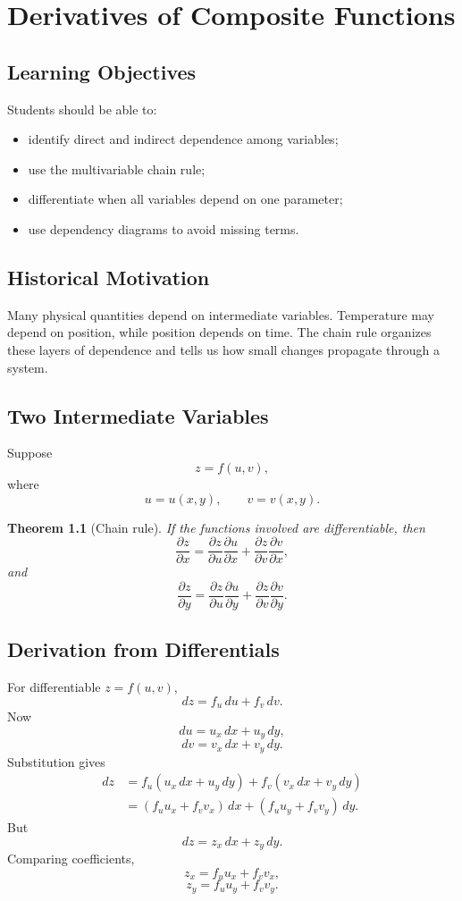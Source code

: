 \documentclass[11pt,oneside]{book}
\theoremstyle{studentthm}
\newtheorem{theorem}{Theorem}[chapter]
\theoremstyle{definition}
\newcommand{\pd}[2]{\frac{\partial #1}{\partial #2}}
\begin{document}
\chapter{Derivatives of Composite Functions}

\section*{Learning Objectives}
Students should be able to:
\begin{itemize}
\item identify direct and indirect dependence among variables;
\item use the multivariable chain rule;
\item differentiate when all variables depend on one parameter;
\item use dependency diagrams to avoid missing terms.
\end{itemize}

\section*{Historical Motivation}

Many physical quantities depend on intermediate variables.
Temperature may depend on position, while position depends on time.
The chain rule organizes these layers of dependence and tells us how
small changes propagate through a system.

\section{Two Intermediate Variables}

Suppose
\[
z=f(u,v),
\]
where
\[
u=u(x,y),
\qquad
v=v(x,y).
\]

\begin{theorem}[Chain rule]
If the functions involved are differentiable, then
\[
\pd{z}{x}
=
\pd{z}{u}\pd{u}{x}
+
\pd{z}{v}\pd{v}{x},
\]
and
\[
\pd{z}{y}
=
\pd{z}{u}\pd{u}{y}
+
\pd{z}{v}\pd{v}{y}.
\]
\end{theorem}

\section{Derivation from Differentials}

For differentiable \(z=f(u,v)\),
\[
dz=f_u\,du+f_v\,dv.
\]
Now
\[
du=u_x\,dx+u_y\,dy,
\]
\[
dv=v_x\,dx+v_y\,dy.
\]
Substitution gives
\[
\begin{aligned}
dz
&=
f_u(u_x\,dx+u_y\,dy)
+
f_v(v_x\,dx+v_y\,dy)\\
&=
(f_u u_x+f_v v_x)\,dx
+
(f_u u_y+f_v v_y)\,dy.
\end{aligned}
\]
But
\[
dz=z_x\,dx+z_y\,dy.
\]
Comparing coefficients,
\[
z_x=f_u u_x+f_v v_x,
\]
\[
z_y=f_u u_y+f_v v_y.
\]
\end{document}
